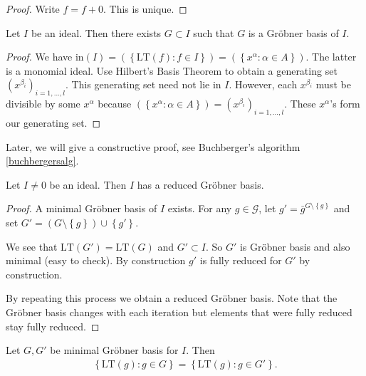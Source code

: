 \documentclass[a4paper, 11pt]{article}
\begin{document}
\begin{proof}
  Write \(  f = f + 0 \). This is unique.
\end{proof}

\begin{prop}
  Let \( I \) be an ideal. Then there exists \( G \subset I \) such that \( G \) is a Gröbner basis of \( I \).
\end{prop}

\begin{proof}
  We have \( \mathrm{in}(I) = (\left\{ \mathrm{LT}(f) : f \in I \right\}) = (\left\{ x^\alpha : \alpha \in A \right\}) \). The latter is a monomial ideal. Use Hilbert's Basis Theorem to obtain a generating set \( (x^{\beta_i})_{i=1,\dots,l} \). This generating set need not lie in \( I \). However, each \( x^{\beta_i} \) must be divisible by some \( x^\alpha \) because \(  (\left\{ x^\alpha : \alpha \in A \right\}) = (x^{\beta_i})_{i=1,\dots,l} \). These \( x^\alpha \)'s form our generating set.
\end{proof}

Later, we will give a constructive proof, see Buchberger's algorithm \ref{buchbergersalg}.

\begin{prop}
  Let \( I \neq 0 \) be an ideal. Then \( I \) has a reduced Gröbner basis.
\end{prop}

\begin{proof}
  A minimal Gröbner basis of \( I \) exists. For any \( g \in \mathcal{G} \), let \( g' = \bar g^{G \setminus \left\{ g \right\}} \) and set \( G' = (G \setminus \left\{ g \right\}) \cup \left\{ g' \right\} \).

  We see that \( \mathrm{LT}(G') = \mathrm{LT}(G) \) and \( G' \subset I \). So \( G' \) is Gröbner basis and also minimal (easy to check). By construction \( g' \) is fully reduced for \( G' \) by construction.

  By repeating this process we obtain a reduced Gröbner basis. Note that the Gröbner basis changes with each iteration but elements that were fully reduced stay fully reduced. 
\end{proof}

\begin{lemma}
  Let \( G, G' \) be minimal Gröbner basis for \( I \). Then 
  \begin{align*}
    \left\{ \mathrm{LT}(g) : g \in G \right\} = \left\{ \mathrm{LT}(g) : g \in G' \right\} .
  \end{align*}
\end{lemma}
\end{document}
